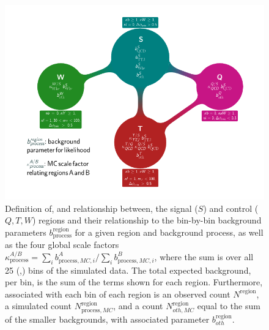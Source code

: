 \begin{figure}[p]
  \centering
  \includegraphics[width=\textwidth]{figures/razor_strategy/BoostFlowChart_noZ}
  \caption{Definition of, and relationship between, the signal ($S$) and control ($Q,T,W$) regions
and their relationship to the bin-by-bin background parameters
$b^{\textrm{region}}_{\textrm{process}}$ for a given region and background process, as well as the
four global scale factors $\kappa^{A/B}_{\textrm{process}} = \sum_i b^A_{\textrm{process}, MC, i} /
\sum_i b^B_{\textrm{process}, MC, i}$, where the sum is over all 25 (\mr,\rsq) bins of the simulated
data. 
The total expected background, per bin, is the sum of the terms shown for each region. Furthermore,
associated with each bin of each region is an observed count $N^{\textrm{region}}$, a simulated
count $N^{\textrm{region}}_{\textrm{process}, MC}$, and a count $N^{\textrm{region}}_{oth, MC}$
equal to the sum of the smaller backgrounds, with associated parameter $b^{\textrm{region}}_{oth}$.
  \label{fig:boost_flowchart}}
\end{figure}

% 
